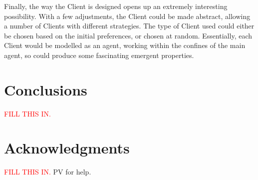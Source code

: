 \documentclass{acm_proc_article-sp}
\begin{document}
 Finally, the way the Client is designed opens up an extremely interesting possibility.  With a few adjustments, the Client could be made abstract, allowing a number of Clients with different strategies.  The type of Client used could either be chosen based on the initial preferences, or chosen at random.  Essentially, each Client would be modelled as an agent, working within the confines of the main agent, so could produce some fascinating emergent properties.

\section{Conclusions}
 \label{conc}
 \textcolor{red}{FILL THIS IN.}

\section{Acknowledgments}
 \textcolor{red}{FILL THIS IN.}
PV for help.

%

%
%
\balancecolumns
\end{document}

